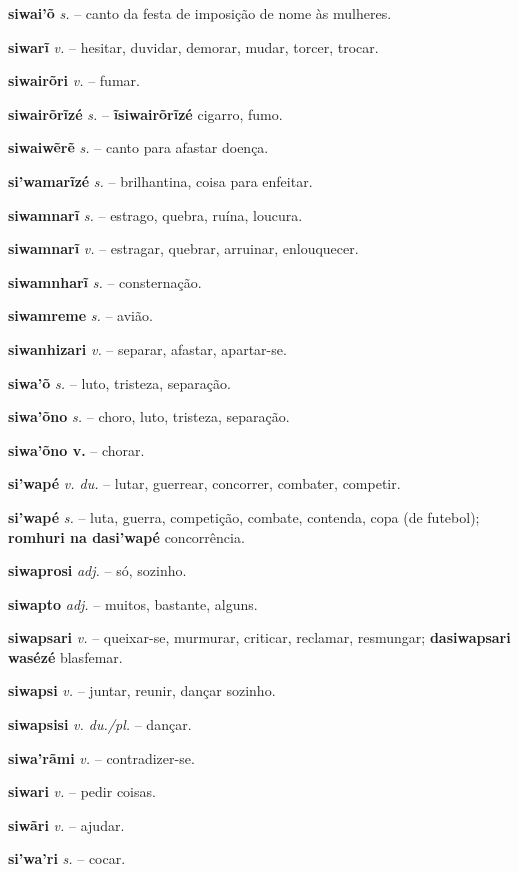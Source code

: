 \textbf{siwai'õ} \textit{s.} -- canto da festa de imposição de nome às mulheres.

\textbf{siwarĩ} \textit{v.} -- hesitar, duvidar, demorar, mudar, torcer, trocar.

\textbf{siwairõri} \textit{v.} -- fumar.

\textbf{siwairõrĩzé} \textit{s.} -- \textbf{ĩsiwairõrĩzé} cigarro, fumo.

\textbf{siwaiwẽrẽ} \textit{s.} -- canto para afastar doença.

\textbf{si'wamarĩzé} \textit{s.} -- brilhantina, coisa para enfeitar.

\textbf{siwamnarĩ} \textit{s.} -- estrago, quebra, ruína, loucura.

\textbf{siwamnarĩ} \textit{v.} -- estragar, quebrar, arruinar, enlouquecer.

\textbf{siwamnharĩ} \textit{s.} -- consternação.

\textbf{siwamreme} \textit{s.} -- avião.

\textbf{siwanhizari} \textit{v.} -- separar, afastar, apartar-se.

\textbf{siwa'õ} \textit{s.} -- luto, tristeza, separação.

\textbf{siwa'õno} \textit{s.} -- choro, luto, tristeza, separação.

\textbf{siwa'õno v.} -- chorar.

\textbf{si'wapé} \textit{v. du.} -- lutar, guerrear, concorrer, combater, competir.

\textbf{si'wapé} \textit{s.} -- luta, guerra, competição, combate, contenda, copa (de futebol); \textbf{romhuri na dasi'wapé} concorrência.

\textbf{siwaprosi} \textit{adj.} -- só, sozinho.

\textbf{siwapto} \textit{adj.} -- muitos, bastante, alguns.

\textbf{siwapsari} \textit{v.} -- queixar-se, murmurar, criticar, reclamar, resmungar; \textbf{dasiwapsari wasézé} blasfemar.

\textbf{siwapsi} \textit{v.} -- juntar, reunir, dançar sozinho.

\textbf{siwapsisi} \textit{v. du./pl.} -- dançar.

\textbf{siwa'rãmi} \textit{v.} -- contradizer-se.

\textbf{siwari} \textit{v.} -- pedir coisas.

\textbf{siwãri} \textit{v.} -- ajudar.

\textbf{si'wa'ri} \textit{s.} -- cocar.

